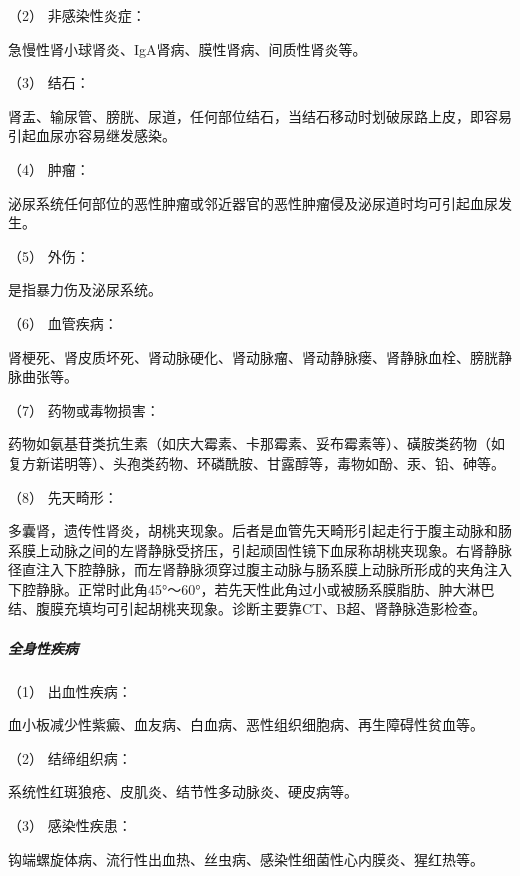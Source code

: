 \hypertarget{text00037.htmlux5cux23CHP1-15-1-1-2}{}
（2） 非感染性炎症：

急慢性肾小球肾炎、IgA肾病、膜性肾病、间质性肾炎等。

\hypertarget{text00037.htmlux5cux23CHP1-15-1-1-3}{}
（3） 结石：

肾盂、输尿管、膀胱、尿道，任何部位结石，当结石移动时划破尿路上皮，即容易引起血尿亦容易继发感染。

\hypertarget{text00037.htmlux5cux23CHP1-15-1-1-4}{}
（4） 肿瘤：

泌尿系统任何部位的恶性肿瘤或邻近器官的恶性肿瘤侵及泌尿道时均可引起血尿发生。

\hypertarget{text00037.htmlux5cux23CHP1-15-1-1-5}{}
（5） 外伤：

是指暴力伤及泌尿系统。

\hypertarget{text00037.htmlux5cux23CHP1-15-1-1-6}{}
（6） 血管疾病：

肾梗死、肾皮质坏死、肾动脉硬化、肾动脉瘤、肾动静脉瘘、肾静脉血栓、膀胱静脉曲张等。

\hypertarget{text00037.htmlux5cux23CHP1-15-1-1-7}{}
（7） 药物或毒物损害：

药物如氨基苷类抗生素（如庆大霉素、卡那霉素、妥布霉素等）、磺胺类药物（如复方新诺明等）、头孢类药物、环磷酰胺、甘露醇等，毒物如酚、汞、铅、砷等。

\hypertarget{text00037.htmlux5cux23CHP1-15-1-1-8}{}
（8） 先天畸形：

多囊肾，遗传性肾炎，胡桃夹现象。后者是血管先天畸形引起走行于腹主动脉和肠系膜上动脉之间的左肾静脉受挤压，引起顽固性镜下血尿称胡桃夹现象。右肾静脉径直注入下腔静脉，而左肾静脉须穿过腹主动脉与肠系膜上动脉所形成的夹角注入下腔静脉。正常时此角45°～60°，若先天性此角过小或被肠系膜脂肪、肿大淋巴结、腹膜充填均可引起胡桃夹现象。诊断主要靠CT、B超、肾静脉造影检查。

\subparagraph{全身性疾病}

\hypertarget{text00037.htmlux5cux23CHP1-15-1-2-1}{}
（1） 出血性疾病：

血小板减少性紫癜、血友病、白血病、恶性组织细胞病、再生障碍性贫血等。

\hypertarget{text00037.htmlux5cux23CHP1-15-1-2-2}{}
（2） 结缔组织病：

系统性红斑狼疮、皮肌炎、结节性多动脉炎、硬皮病等。

\hypertarget{text00037.htmlux5cux23CHP1-15-1-2-3}{}
（3） 感染性疾患：

钩端螺旋体病、流行性出血热、丝虫病、感染性细菌性心内膜炎、猩红热等。

